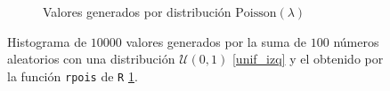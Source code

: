 \documentclass[paper=leter, fontsize=11pt]{scrartcl}
\numberwithin{equation}{section}		%
\numberwithin{figure}{section}			%
\numberwithin{table}{section}				%
\begin{document}
\begin{figure}
\begin{subfigure}{0.5\textwidth}
        \caption{Valores generados por distribución $\text{Poisson}(\lambda)$}
        \label{unif_der}
    \end{subfigure}
    \caption{Histograma de $10000$ valores generados por la suma de $100$ números aleatorios con una distribución $\mathcal{U}(0, 1)$ \ref{unif_izq} y el obtenido por la función \texttt{rpois} de \texttt{R} \ref{unif_der}.}
    \label{unif}
\end{figure}



\end{document}
